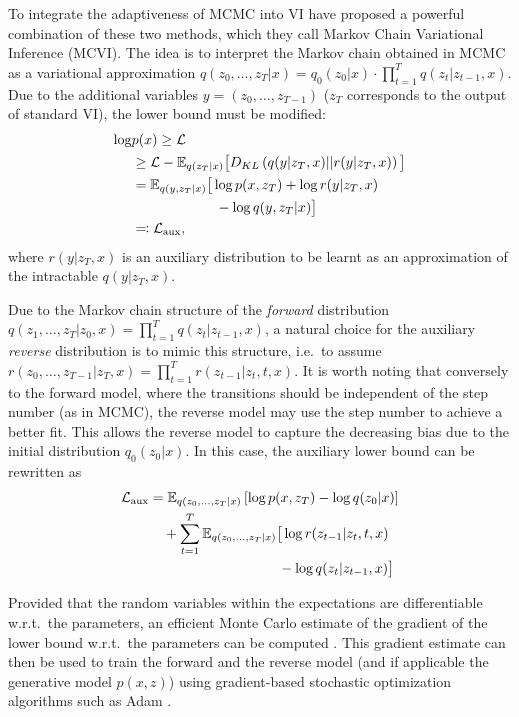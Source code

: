 To integrate the adaptiveness of MCMC into VI \textcite{Salimans2014} have proposed a powerful combination of these two methods, which they call Markov Chain Variational Inference (MCVI). The idea is to interpret the Markov chain obtained in MCMC as a variational approximation $q(z_0, \dots, z_T|x) = q_{0}(z_0|x) \cdot \prod_{t=1}^T q(z_t|z_{t-1}, x)$. Due to the additional variables $y = (z_0, \dots, z_{T-1})$ ($z_T$ corresponds to the output of standard VI), the lower bound must be modified:
\begin{equation}
\begin{split}
\log &p(x) \geq \mathcal{L} \\
	   &\geq \mathcal{L} - \mathbb{E}_{q(z_T|x)} \big[ D_{KL} \left( q(y |z_T, x) || r(y|z_T, x) \right) \big] \\
	   &=  \mathbb{E}_{q(y, z_T|x)} \big[ \log p(x, z_T) + \log r(y |z_T, x) \\
	   &\qquad\qquad\qquad  - \log q(y, z_{T} |x) \big] \\
	   &\eqqcolon \mathcal{L}_{\textrm{aux}},
\end{split}
\end{equation}
where $r(y|z_T, x)$ is an auxiliary distribution to be learnt as an approximation of the intractable $q(y |z_T, x)$. 

Due to the Markov chain structure of the \textit{forward} distribution $q(z_1, \dots, z_T|z_0, x) = \prod_{t=1}^T q(z_t|z_{t-1}, x)$, a natural choice for the auxiliary \textit{reverse} distribution is to mimic this structure, i.e.\ to assume $r(z_0, \dots, z_{T-1} |z_T, x) = \prod_{t=1}^T r(z_{t-1}|z_t, t, x)$. It is worth noting that conversely to the forward model, where the transitions should be independent of the step number (as in MCMC), the reverse model may use the step number to achieve a better fit. This allows the reverse model to capture the decreasing bias due to the initial distribution $q_0(z_0|x)$. In this case, the auxiliary lower bound can be rewritten as
\begin{equation} \label{eq:MCVIAuxLowerBound}
\begin{split}
\mathcal{L}_{\textrm{aux}} &= \mathbb{E}_{q(z_0, \dots, z_T|x)} \left[ \log p(x, z_T) - \log q(z_0|x) \right] \\
& \quad + \sum_{t=1}^T \mathbb{E}_{q(z_0, \dots, z_T|x)} \big[ \log r(z_{t-1}|z_t, t, x) \\
& \quad\qquad\qquad\qquad\qquad\; - \log q(z_t|z_{t-1}, x)  \big] 
\end{split}
\end{equation}

Provided that the random variables within the expectations are differentiable w.r.t.\ the parameters, an efficient Monte Carlo estimate of the gradient of the lower bound w.r.t.\ the parameters can be computed \parencite{Kingma2014, Rezende2014}. This gradient estimate can then be used to train the forward and the reverse model (and if applicable the generative model $p(x, z)$) using gradient-based stochastic optimization algorithms such as Adam \parencite{Kingma2015}.
